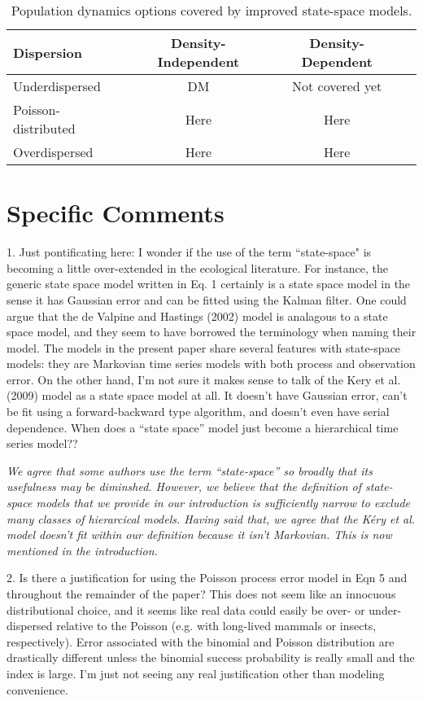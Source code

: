 \documentclass[12pt,english]{article}
\begin{document}
\begin{spacing}{1.9}
\begin{flushleft}
\begin{table}[t]
  \centering
\caption{Population dynamics options covered by improved state-space models.}  
\begin{tabular}{lccc}
    \hline
Dispersion & Density-Independent & Density-Dependent  \\    
\hline
    Underdispersed	        &DM	&Not covered yet  \\
    Poisson-distributed	        &Here	&Here   \\
    Overdispersed		 &Here	&Here    \\
    \hline
  \end{tabular}
\end{table}


\section*{Specific Comments}

1. Just pontificating here: I wonder if the use of the term “state-space" is becoming a little over-extended 
in the ecological literature. For instance, the generic state space model written in Eq. 1 certainly is a 
state space model in the sense it has Gaussian error and can be fitted using the Kalman filter. One could 
argue that the de Valpine and Hastings (2002) model is analagous to a state space model, and they seem 
to have borrowed the terminology when naming their model. The models in the present paper share 
several features with state-space models: they are Markovian time series models with both process and 
observation error. On the other hand, I'm not sure it makes sense to talk of the Kery et al. (2009) model 
as a state space model at all. It doesn't have Gaussian error, can't be fit using a forward-backward type 
algorithm, and doesn't even have serial dependence. When does a “state space” model just become a 
hierarchical time series model??

\vspace{0.5cm}
\textit{We agree that some authors use the term ``state-space'' so broadly that its usefulness may be diminshed. However, we believe that the definition of state-space models that we provide in our introduction is sufficiently narrow to exclude many classes of hierarcical models. Having said that, we agree that the K\'{e}ry et al. model doesn't fit within our definition because it isn't Markovian. This is now mentioned in the introduction.}
\vspace{0.5cm}

2. Is there a justification for using the Poisson process error model in Eqn 5 and throughout the remainder 
of the paper? This does not seem like an innocuous distributional choice, and it seems like real data could 
easily be over- or under-dispersed relative to the Poisson (e.g. with long-lived mammals or insects, respectively). 
Error associated with the binomial and Poisson distribution are drastically different unless the binomial success 
probability is really small and the index is large. I'm just not seeing any real justification other than modeling convenience.


\end{flushleft}
\end{spacing}
\end{document}
